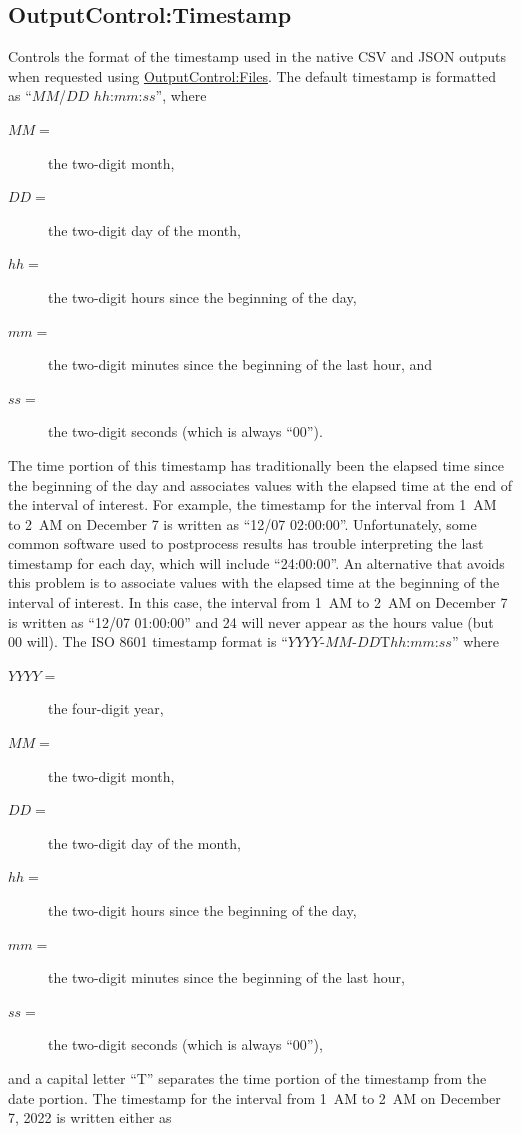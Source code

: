 \subsection{OutputControl:Timestamp}\label{outputcontrol_timestamp}

Controls the format of the timestamp used in the native CSV and JSON outputs when requested using \hyperref[outputcontrolfiles]{OutputControl:Files}. The default timestamp is formatted
as ``$MM$/$DD$ $hh$:$mm$:$ss$'', where

\begin{description}
\item[\(MM =\)] the two-digit month,
\item[\(DD =\)] the two-digit day of the month,
\item[\(hh =\)] the two-digit hours since the beginning of the day,
\item[\(mm =\)] the two-digit minutes since the beginning of the last hour, and
\item[\(ss =\)] the two-digit seconds (which is always ``00'').
\end{description}
%
The time portion of this timestamp has traditionally been the elapsed time since the beginning of the day and associates values
with the elapsed time at the end of the interval of interest.  For example, the timestamp for the interval from 1~AM to 2~AM on
December 7 is written as ``12/07 02:00:00''. Unfortunately, some common software used to postprocess results has trouble
interpreting the last timestamp for each day, which will include ``24:00:00''. An alternative that avoids this problem is to
associate values with the elapsed time at the beginning of the interval of interest. In this case, the interval from 1~AM to
2~AM on December 7 is written as ``12/07 01:00:00'' and 24 will never appear as the hours value (but 00 will). The ISO 8601
timestamp format is ``$YYYY$-$MM$-$DD$T$hh$:$mm$:$ss$'' where

\begin{description}
\item[\(YYYY =\)] the four-digit year,
\item[\(MM =\)] the two-digit month,
\item[\(DD =\)] the two-digit day of the month,
\item[\(hh =\)] the two-digit hours since the beginning of the day,
\item[\(mm =\)] the two-digit minutes since the beginning of the last hour,
\item[\(ss =\)] the two-digit seconds (which is always ``00''),
\end{description}
%
and a capital letter ``T'' separates the time portion of the timestamp from the date portion. The timestamp for the interval from
1~AM to 2~AM on December 7, 2022 is written either as

